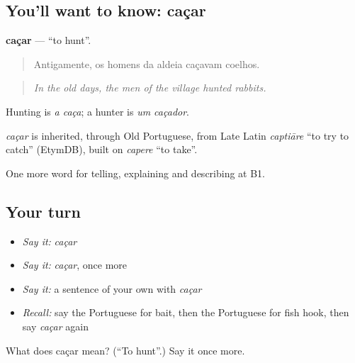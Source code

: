 \subsection*{You'll want to know: caçar}
\textbf{caçar} — \textquotedblleft{}to hunt\textquotedblright{}.

\begin{quote}
Antigamente, os homens da aldeia caçavam coelhos.
\end{quote}

\begin{quote}
\emph{In the old days, the men of the village hunted rabbits.}
\end{quote}

Hunting is \emph{a caça}; a hunter is \emph{um caçador}.

\begin{cousinweb}
\emph{caçar} is inherited, through Old Portuguese, from Late Latin \emph{captiāre} \textquotedblleft{}to try to catch\textquotedblright{} (EtymDB), built on \emph{capere} \textquotedblleft{}to take\textquotedblright{}.
\end{cousinweb}

\begin{grammarlens}[title={What you've built}]
One more word for telling, explaining and describing at B1.
\end{grammarlens}

\subsection*{Your turn}
\begin{itemize}
\raggedright
  \item \emph{Say it:} \emph{caçar}
  \item \emph{Say it:} \emph{caçar}, once more
  \item \emph{Say it:} a sentence of your own with \emph{caçar}
  \item \emph{Recall:} say the Portuguese for bait, then the Portuguese for fish hook, then say \emph{caçar} again
\end{itemize}

\begin{tcolorbox}[breakable,colback=teal!4,colframe=teal!35!black,title={Before you move on}]
What does caçar mean? (\textquotedblleft{}To hunt\textquotedblright{}.) Say it once more.
\end{tcolorbox}
